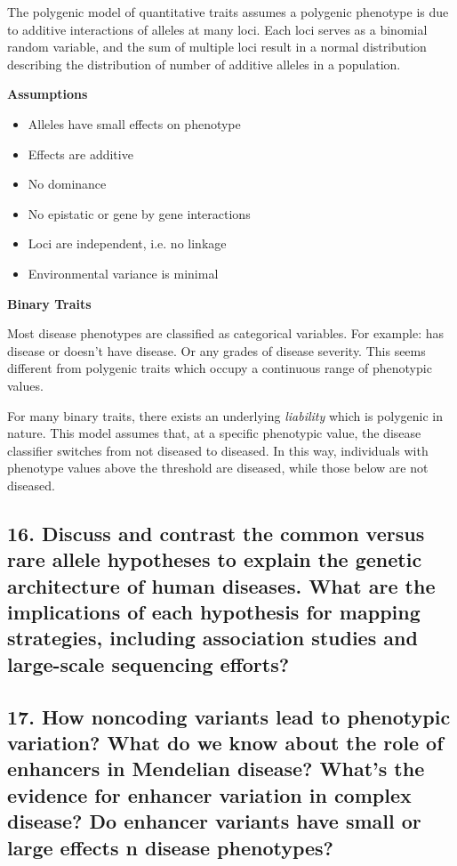 \documentclass{tufte-handout}
\theoremstyle{noparens}
\begin{document}
The polygenic model of quantitative traits assumes a polygenic phenotype is due to additive interactions of alleles at many loci. Each loci serves as a binomial random variable, and the sum of multiple loci result in a normal distribution describing the distribution of number of additive alleles in a population.

\textbf{Assumptions}

\begin{itemize}
\item Alleles have small effects on phenotype
\item Effects are additive
\item No dominance
\item No epistatic or gene by gene interactions
\item Loci are independent, i.e. no linkage
\item Environmental variance is minimal
\end{itemize}

\noindent
\textbf{Binary Traits}

Most disease phenotypes are classified as categorical variables. For example: has disease or doesn't have disease. Or any grades of disease severity. This seems different from polygenic traits which occupy a continuous range of phenotypic values.

For many binary traits, there exists an underlying \emph{liability} which is polygenic in nature. This model assumes that, at a specific phenotypic value, the disease classifier switches from not diseased to diseased. In this way, individuals with phenotype values above the threshold are diseased, while those below are not diseased.

\newpage
\subsection{16. Discuss and contrast the common versus rare allele hypotheses to explain the genetic architecture of human diseases. What are the implications of each hypothesis for mapping strategies, including association studies and large-scale sequencing efforts?}

\newpage 
\subsection{17. How noncoding variants lead to phenotypic variation? What do we know about the role of enhancers in Mendelian disease? What's the evidence for enhancer variation in complex disease? Do enhancer variants have small or large effects n disease phenotypes?}
\end{document}
